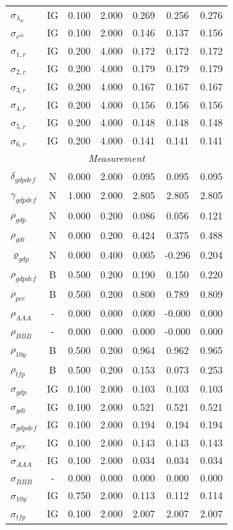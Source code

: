 \documentclass[12pt]{article}
\begin{document}
{\begin{longtable}{lcccccc}
$\sigma_{\lambda_w}$ & IG &    0.100 &    2.000 &    0.269 &    0.256 &    0.276 \\
$\sigma_{r^m}$ & IG &    0.100 &    2.000 &    0.146 &    0.137 &    0.156 \\
$\sigma_{1,r}$ & IG &    0.200 &    4.000 &    0.172 &    0.172 &    0.172 \\
$\sigma_{2,r}$ & IG &    0.200 &    4.000 &    0.179 &    0.179 &    0.179 \\
$\sigma_{3,r}$ & IG &    0.200 &    4.000 &    0.167 &    0.167 &    0.167 \\
$\sigma_{4,r}$ & IG &    0.200 &    4.000 &    0.156 &    0.156 &    0.156 \\
$\sigma_{5,r}$ & IG &    0.200 &    4.000 &    0.148 &    0.148 &    0.148 \\
$\sigma_{6,r}$ & IG &    0.200 &    4.000 &    0.141 &    0.141 &    0.141 \\
\multicolumn{7}{c}{\textit{Measurement}} \\[3pt]
$\delta_{gdpdef}$ & N &    0.000 &    2.000 &    0.095 &    0.095 &    0.095 \\
$\gamma_{gdpdef}$ & N &    1.000 &    2.000 &    2.805 &    2.805 &    2.805 \\
$\rho_{gdp}$ & N &    0.000 &    0.200 &    0.086 &    0.056 &    0.121 \\
$\rho_{gdi}$ & N &    0.000 &    0.200 &    0.424 &    0.375 &    0.488 \\
$\varrho_{gdp}$ & N &    0.000 &    0.400 &    0.005 &   -0.296 &    0.204 \\
$\rho_{gdpdef}$ & B &    0.500 &    0.200 &    0.190 &    0.150 &    0.220 \\
$\rho_{pce}$ & B &    0.500 &    0.200 &    0.800 &    0.789 &    0.809 \\
$\rho_{AAA}$ & - &    0.000 &    0.000 &    0.000 &   -0.000 &    0.000 \\
$\rho_{BBB}$ & - &    0.000 &    0.000 &    0.000 &   -0.000 &    0.000 \\
$\rho_{10y}$ & B &    0.500 &    0.200 &    0.964 &    0.962 &    0.965 \\
$\rho_{tfp}$ & B &    0.500 &    0.200 &    0.153 &    0.073 &    0.253 \\
$\sigma_{gdp}$ & IG &    0.100 &    2.000 &    0.103 &    0.103 &    0.103 \\
$\sigma_{gdi}$ & IG &    0.100 &    2.000 &    0.521 &    0.521 &    0.521 \\
$\sigma_{gdpdef}$ & IG &    0.100 &    2.000 &    0.194 &    0.194 &    0.194 \\
$\sigma_{pce}$ & IG &    0.100 &    2.000 &    0.143 &    0.143 &    0.143 \\
$\sigma_{AAA}$ & IG &    0.100 &    2.000 &    0.034 &    0.034 &    0.034 \\
$\sigma_{BBB}$ & - &    0.000 &    0.000 &    0.000 &    0.000 &    0.000 \\
$\sigma_{10y}$ & IG &    0.750 &    2.000 &    0.113 &    0.112 &    0.114 \\
$\sigma_{tfp}$ & IG &    0.100 &    2.000 &    2.007 &    2.007 &    2.007 \\
\end{longtable}}
\end{document}

